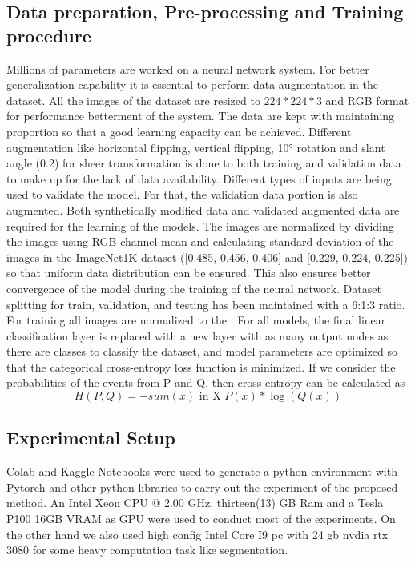 \subsection{Data preparation, Pre-processing and Training  procedure}
Millions of parameters are worked on a neural network system. For better generalization capability it is essential to perform data augmentation in the dataset. All the images of the dataset are resized to \(224 * 224 * 3\) and RGB format for performance betterment of the system. The data are kept with maintaining proportion so that a good learning capacity can be achieved. Different augmentation like horizontal flipping, vertical flipping, 10° rotation and slant angle (0.2) for sheer transformation is done to both training and validation data to make up for the lack of data availability. Different types of inputs are being used to validate the model. For that, the validation data portion is also augmented. Both synthetically modified data and validated augmented data are required for the learning of the models. The images are normalized by dividing the images using RGB channel mean and calculating standard deviation of the images in the ImageNet1K dataset ([0.485, 0.456, 0.406] and [0.229, 0.224, 0.225]) so that uniform data distribution can be ensured. This also ensures better convergence of the model during the training of the neural network. Dataset splitting for train, validation, and testing has been maintained with a 6:1:3 ratio. For training all images are normalized to the . For all models, the final linear classification layer is replaced with a new layer with as many output nodes as there are classes to classify the dataset, and model parameters are optimized so that the categorical cross-entropy loss function is minimized.  If we consider the probabilities of the events from P and Q, then cross-entropy can be calculated as-
\begin{equation}
    H(P, Q) = -sum(x)\text{ in X } P(x) * \log(Q(x))
\end{equation}


\subsection{Experimental Setup}
Colab and Kaggle Notebooks were used to generate a python environment with Pytorch and other python libraries to carry out the experiment of the proposed method. An Intel Xeon CPU @ 2.00 GHz, thirteen(13) GB Ram and a  Tesla P100 16GB VRAM as GPU were used to conduct most of the experiments. On the other hand we also used high config Intel Core I9 pc with 24 gb nvdia rtx 3080 for some heavy computation task like segmentation.

